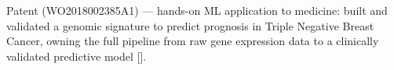 \vspace*{.2em}
Patent (WO2018002385A1) --- hands-on ML application to medicine: built and validated a genomic signature to predict prognosis in Triple Negative Breast Cancer, owning the full pipeline from raw gene expression data to a clinically validated predictive model [].
